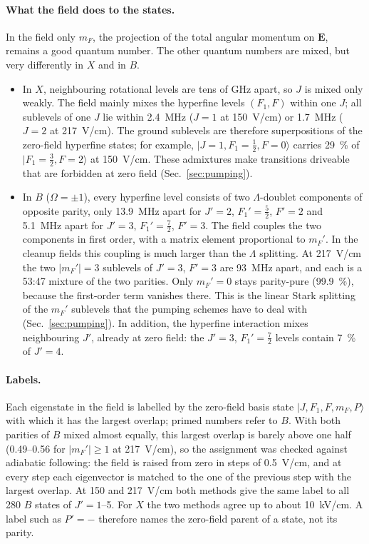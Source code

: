 \documentclass[11pt,a4paper,oneside]{report}
\begin{document}
\paragraph{What the field does to the states.} In the field only $m_F$, the projection of the total
angular momentum on $\mathbf E$, remains a good quantum number. The other quantum numbers are mixed,
but very differently in $X$ and in $B$.
\begin{itemize}[itemsep=1pt]
  \item In $X$, neighbouring rotational levels are tens of GHz apart, so $J$ is mixed only weakly. The
        field mainly mixes the hyperfine levels $(F_1,F)$ within one $J$; all sublevels of one $J$
        lie within \SI{2.4}{MHz} ($J=1$ at \SI{150}{V/cm}) or \SI{1.7}{MHz} ($J=2$ at
        \SI{217}{V/cm}). The ground sublevels are therefore
        superpositions of the zero-field hyperfine states; for example,
        $|J=1,F_1=\tfrac12,F=0\rangle$ carries \SI{29}{\percent} of $|F_1=\tfrac32,F=2\rangle$ at
        \SI{150}{V/cm}. These admixtures make transitions driveable that are forbidden at zero field
        (Sec.~\ref{sec:pumping}).
  \item In $B$ ($\Omega=\pm1$), every hyperfine level consists of two $\Lambda$-doublet components of
        opposite parity, only \SI{13.9}{MHz} apart for $J'=2$, $F_1'=\tfrac52$, $F'=2$ and
        \SI{5.1}{MHz} apart for $J'=3$, $F_1'=\tfrac72$, $F'=3$. The field couples the two
        components in first order, with a matrix element proportional to $m_F'$. In the cleanup
        fields this coupling is much larger than the $\Lambda$ splitting. At \SI{217}{V/cm} the two
        $|m_F'|=3$ sublevels of $J'=3$, $F'=3$ are \SI{93}{MHz} apart, and each is a 53:47 mixture of
        the two parities. Only $m_F'=0$ stays parity-pure (\SI{99.9}{\percent}), because the
        first-order term vanishes there. This is the linear Stark splitting of the $m_F'$ sublevels
        that the pumping schemes have to deal with (Sec.~\ref{sec:pumping}). In addition, the
        hyperfine interaction mixes neighbouring $J'$, already at zero field: the $J'=3$,
        $F_1'=\tfrac72$ levels contain \SI{7}{\percent} of $J'=4$.
\end{itemize}

\paragraph{Labels.} Each eigenstate in the field is labelled by the zero-field basis state
$|J,F_1,F,m_F,P\rangle$ with which it has the largest overlap; primed numbers refer to $B$. With both
parities of $B$ mixed almost equally, this largest overlap is barely above one half (0.49--0.56 for
$|m_F'|\geq1$ at \SI{217}{V/cm}), so the assignment was checked against adiabatic following: the
field is raised from zero in steps of \SI{0.5}{V/cm}, and at every step each eigenvector is matched to
the one of the previous step with the largest overlap. At 150 and \SI{217}{V/cm} both methods give
the same label to all 280 $B$ states of $J'=1$--5. For $X$ the two methods agree up to about
\SI{10}{kV/cm}. A label such as $P'=-$ therefore names the zero-field parent of a state, not its
parity.
\end{document}
